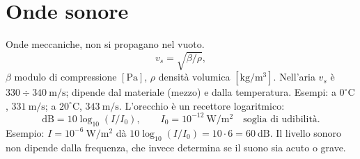\documentclass[11pt,a4paper]{article}
\newcommand{\pagina}[1]{\clearpage}
\begin{document}
\section*{Onde sonore}
Onde meccaniche, non si propagano nel vuoto.
\[v_s=\sqrt{\beta/\rho},\]
$\beta$ modulo di compressione $[\mathrm{Pa}]$, $\rho$ densità volumica $[\mathrm{kg/m^3}]$. Nell'aria $v_s$ è $330\div340\ \mathrm{m/s}$; dipende dal materiale (mezzo) e dalla temperatura.
Esempi: a $0^\circ\mathrm C$, $331\ \mathrm{m/s}$; a $20^\circ\mathrm C$, $343\ \mathrm{m/s}$.
L'orecchio è un recettore logaritmico:
\[\mathrm{dB}=10\log_{10}(I/I_0),\qquad I_0=10^{-12}\ \mathrm{W/m^2}\quad\text{soglia di udibilità}.\]
Esempio: $I=10^{-6}\ \mathrm{W/m^2}$ dà $10\log_{10}(I/I_0)=10\cdot6=60\ \mathrm{dB}$.
\pagina{11}
Il livello sonoro non dipende dalla frequenza, che invece determina se il suono sia acuto o grave.
\end{document}
